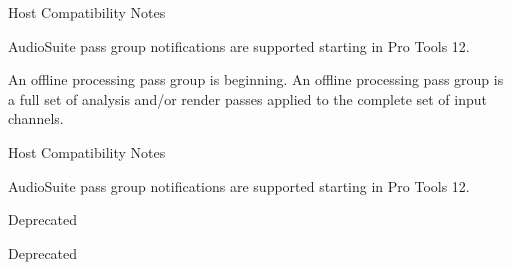 \begin{Desc}
\begin{description}
\begin{DoxyRefDesc}{Host Compatibility Notes}
\item[\hyperlink{a00380__compatibility_notes000046}{Host Compatibility Notes}]Audio\+Suite pass group notifications are supported starting in Pro Tools 12. \end{DoxyRefDesc}
\item[{\em 
\hypertarget{a00206_a6ec854be40c8cf810dec97de3e56c0a7a1fb443ff62601d3e5f5562a4af8edf41}{}A\+A\+X\+\_\+e\+Processing\+State\+\_\+\+Begin\+Pass\+Group\label{a00206_a6ec854be40c8cf810dec97de3e56c0a7a1fb443ff62601d3e5f5562a4af8edf41}
}]An offline processing pass group is beginning. An offline processing pass group is a full set of analysis and/or render passes applied to the complete set of input channels.

\begin{DoxyRefDesc}{Host Compatibility Notes}
\item[\hyperlink{a00380__compatibility_notes000047}{Host Compatibility Notes}]Audio\+Suite pass group notifications are supported starting in Pro Tools 12. \end{DoxyRefDesc}
\item[{\em 
\hypertarget{a00206_a6ec854be40c8cf810dec97de3e56c0a7afc388bf019f52b4d5bf6978b7ffec6d9}{}A\+A\+X\+\_\+e\+Processing\+State\+\_\+\+Stop\label{a00206_a6ec854be40c8cf810dec97de3e56c0a7afc388bf019f52b4d5bf6978b7ffec6d9}
}]\begin{DoxyRefDesc}{Deprecated}
\item[\hyperlink{a00386__deprecated000011}{Deprecated}]\end{DoxyRefDesc}
\item[{\em 
\hypertarget{a00206_a6ec854be40c8cf810dec97de3e56c0a7ab054f0dd128583d95ffc1b8875be4d01}{}A\+A\+X\+\_\+e\+Processing\+State\+\_\+\+Start\label{a00206_a6ec854be40c8cf810dec97de3e56c0a7ab054f0dd128583d95ffc1b8875be4d01}
}]\begin{DoxyRefDesc}{Deprecated}
\item[\hyperlink{a00386__deprecated000012}{Deprecated}]\end{DoxyRefDesc}
\end{description}
\end{Desc}
